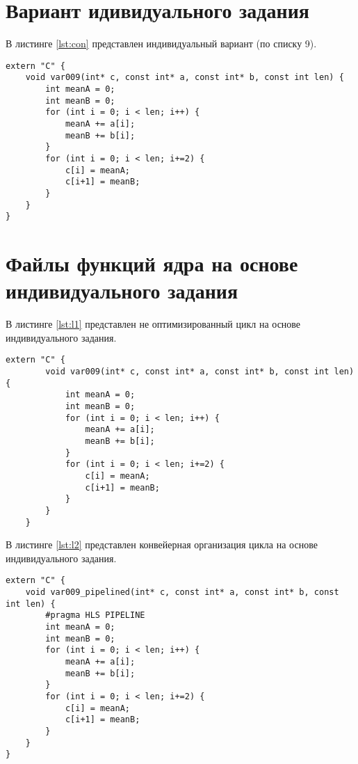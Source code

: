 \chapter*{Вариант идивидуального задания}

В листинге \ref{lst:con} представлен индивидуальный вариант (по списку 9).

\captionsetup{singlelinecheck = false, justification=raggedright}
\begin{lstlisting}[label=lst:con,caption=Индивидуальный вариант 9]
extern "C" {
	void var009(int* c, const int* a, const int* b, const int len) {
		int meanA = 0;
		int meanB = 0;
		for (int i = 0; i < len; i++) {
			meanA += a[i];
			meanB += b[i];
		}
		for (int i = 0; i < len; i+=2) {
			c[i] = meanA;
			c[i+1] = meanB;
		}
	}
}
\end{lstlisting}


\chapter*{Файлы функций ядра на основе индивидуального задания}

В листинге \ref{lst:l1} представлен не оптимизированный цикл на основе индивидуального задания.
\captionsetup{singlelinecheck = false, justification=raggedright}
\begin{lstlisting}[label=lst:l1,caption=Индивидуальный вариант 9]
	extern "C" {
		void var009(int* c, const int* a, const int* b, const int len) {
			int meanA = 0;
			int meanB = 0;
			for (int i = 0; i < len; i++) {
				meanA += a[i];
				meanB += b[i];
			}
			for (int i = 0; i < len; i+=2) {
				c[i] = meanA;
				c[i+1] = meanB;
			}
		}
	}
\end{lstlisting}

В листинге \ref{lst:l2} представлен конвейерная организация цикла на основе индивидуального задания.
\captionsetup{singlelinecheck = false, justification=raggedright}
\begin{lstlisting}[label=lst:l2,caption=Индивидуальный вариант 9]
extern "C" {
	void var009_pipelined(int* c, const int* a, const int* b, const int len) {
		#pragma HLS PIPELINE
		int meanA = 0;
		int meanB = 0;
		for (int i = 0; i < len; i++) {
			meanA += a[i];
			meanB += b[i];
		}
		for (int i = 0; i < len; i+=2) {
			c[i] = meanA;
			c[i+1] = meanB;
		}
	}
}

\end{lstlisting}


